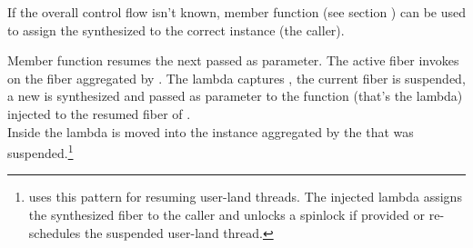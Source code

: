 \xspace\newline

If the overall control flow isn't known, member function \resumewith (see section
) can be used to assign the synthesized \fiber to the correct \fiber
instance (the caller).

Member function  resumes the next  passed as
parameter. The active fiber invokes \resumewith on the fiber aggregated by
. The lambda captures , the current fiber is suspended, a
new \fiber is synthesized and passed as parameter  to the function
(that's the lambda) injected to the resumed fiber of .\\
Inside the lambda  is moved into the instance  aggregated by the
 that was suspended.\footnote{\bfiber\cite{bfiber} uses this 
pattern for resuming user-land threads.
The injected lambda assigns the synthesized fiber to the caller and unlocks a
spinlock if provided or re-schedules the suspended user-land thread.}

